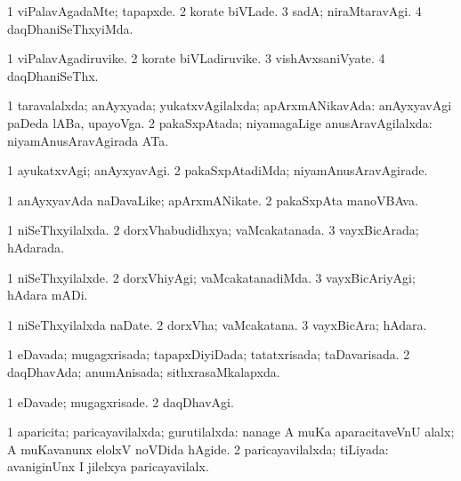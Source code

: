\bentry
{} 
\gl{\kirxvi}
\expl{}
\bmng
\bnum
\num{1} viPalavAgadaMte; tapapxde. 
\num{2} korate biVLade. 
\num{3} sadA; niraMtaravAgi. 
\num{4} daqDhaniSeThxyiMda. 
\enum
\emng
\eentry

\bentry
{} 
\gl{\nA}
\expl{}
\bmng
\bnum
\num{1} viPalavAgadiruvike. 
\num{2} korate biVLadiruvike. 
\num{3} vishAvxsaniVyate. 
\num{4} daqDhaniSeThx. 
\enum
\emng
\eentry

\bentry
{} 
\gl{\gu}
\bmng
\bnum
\num{1} taravalalxda; anAyxyada; yukatxvAgilalxda; apArxmANikavAda:  anAyxyavAgi paDeda lABa, upayoVga. 
\num{2} pakaSxpAtada; niyamagaLige anusAravAgilalxda:  niyamAnusAravAgirada ATa. 
\enum
\emng
\eentry

\bentry
{} 
\gl{\kirxvi}
\expl{}
\bmng
\bnum
\num{1} ayukatxvAgi; anAyxyavAgi. 
\num{2} pakaSxpAtadiMda; niyamAnusAravAgirade. 
\enum
\emng
\eentry

\bentry
{} 
\gl{\nA}
\expl{}
\bmng
\bnum
\num{1} anAyxyavAda naDavaLike; apArxmANikate. 
\num{2} pakaSxpAta manoVBAva. 
\enum
\emng
\eentry

\bentry
{} 
\gl{\gu}
\expl{}
\bmng
\bnum
\num{1} niSeThxyilalxda. 
\num{2} dorxVhabudidhxya; vaMcakatanada. 
\num{3} vayxBicArada; hAdarada. 
\enum
\emng
\eentry

\bentry
{} 
\gl{\kirxvi}
\expl{}
\bmng
\bnum
\num{1} niSeThxyilalxde. 
\num{2} dorxVhiyAgi; vaMcakatanadiMda. 
\num{3} vayxBicAriyAgi; hAdara mADi. 
\enum
\emng
\eentry

\bentry
{} 
\gl{\nA}
\expl{}
\bmng
\bnum
\num{1} niSeThxyilalxda naDate. 
\num{2} dorxVha; vaMcakatana. 
\num{3} vayxBicAra; hAdara. 
\enum
\emng
\eentry

\bentry
{} 
\gl{\gu}
\expl{}
\bmng
\bnum
\num{1} eDavada; mugagxrisada; tapapxDiyiDada; tatatxrisada; taDavarisada. 
\num{2} daqDhavAda; anumAnisada; sithxrasaMkalapxda. 
\enum
\emng
\eentry

\bentry
{} 
\gl{\kirxvi}
\expl{}
\bmng
\bnum
\num{1} eDavade; mugagxrisade. 
\num{2} daqDhavAgi. 
\enum
\emng
\eentry

\bentry
{} 
\gl{\gu}
\expl{}
\bmng
\bnum
\num{1} aparicita; paricayavilalxda; gurutilalxda:  nanage A muKa aparacitaveVnU alalx; A muKavanunx elolxV noVDida hAgide. 
\num{2} paricayavilalxda; tiLiyada:  avaniginUnx I jilelxya paricayavilalx. 
\enum
\emng
\eentry

